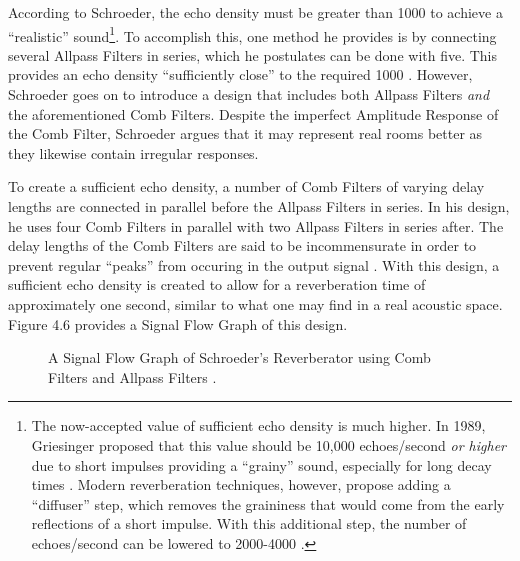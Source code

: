 According to Schroeder, the echo density must be greater than 1000 to achieve a ``realistic'' sound\footnote{The now-accepted value of sufficient echo density is much higher. In 1989, Griesinger proposed that this value should be 10,000 echoes/second \textit{or higher} due to short impulses providing a ``grainy'' sound, especially for long decay times \cite{griesinger1989practical}. Modern reverberation techniques, however, propose adding a ``diffuser'' step, which removes the graininess that would come from the early reflections of a short impulse. With this additional step, the number of echoes/second can be lowered to 2000-4000 \cite{FiftyYears}.}. To accomplish this, one method he provides is by connecting several Allpass Filters in series, which he postulates can be done with five. This provides an echo density ``sufficiently close'' to the required 1000 \cite{schroeder1961natural}. However, Schroeder goes on to introduce a design that includes both Allpass Filters \textit{and} the aforementioned Comb Filters. Despite the imperfect Amplitude Response of the Comb Filter, Schroeder argues that it may represent real rooms better as they likewise contain irregular responses.

To create a sufficient echo density, a number of Comb Filters of varying delay lengths are connected in parallel before the Allpass Filters in series. In his design, he uses four Comb Filters in parallel with two Allpass Filters in series after. The delay lengths of the Comb Filters are said to be incommensurate in order to prevent regular ``peaks'' from occuring in the output signal \cite{schroeder1961natural}. With this design, a sufficient echo density is created to allow for a reverberation time of approximately one second, similar to what one may find in a real acoustic space. Figure 4.6 provides a Signal Flow Graph of this design.

\begin{figure}[h]
	\begin{center}
	\caption{A Signal Flow Graph of Schroeder's Reverberator using Comb Filters and Allpass Filters \cite{schroeder1961natural}.}
	\end{center}
\end{figure}

